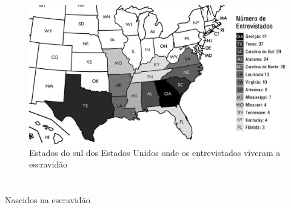 
\movetoevenpage
\thispagestyle{empty}
\begin{vplace}
\begin{figure}[H]
  \hspace*{-1cm}
  \includegraphics[width=120mm]{./imgs/mapa1.jpg}  
  \caption{Estados do sul dos Estados Unidos onde os entrevistados viveram a escravidão}
\end{figure}
\end{vplace}


\chapter*{}
\begin{center}
\begin{vplace}[0.3]
\Large
Nascidos na escravidão
\end{vplace}
\end{center}
\thispagestyle{empty}

\pagebreak
\thispagestyle{empty}

